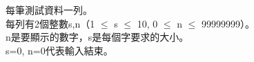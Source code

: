 每筆測試資料一列。\\
每列有2個整數s,n（1 $\leq$ s $\leq$ 10, 0 $\leq$ n $\leq$ 99999999）。\\
n是要顯示的數字，s是每個字要求的大小。\\
s=0, n=0代表輸入結束。\\
